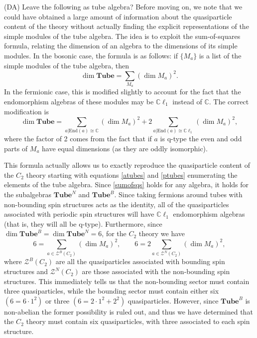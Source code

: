 \documentclass[12pt,a4paper]{article}
\newcommand{\cc}{\mathbb{C}}
\newcommand{\mcz}{\mathcal{Z}}
\newcommand\be            {\begin{equation}}
\newcommand\ee            {\end{equation}}
\newcommand{\End}{\text{End}}
\newcommand{\cl}{\mathbb{C}\ell}
\newcommand{\tube}{\textbf{Tube}}
\newcommand{\dave}[1]{{\color{ao(english)}\footnotesize{(DA) #1}}}
\begin{document}
\dave{Leave the following as tube algebra?}
Before moving on, we note that we could have obtained a large amount of information about the quasiparticle content of the theory without actually finding the explicit representations of the simple modules of the tube algebra. 
The idea is to exploit the sum-of-squares formula, relating the dimension of an algebra to the dimensions of its simple modules. 
In the bosonic case, the formula is as follows: if $\{M_a\}$ is a list of the simple modules of the tube algebra, then 
\be \dim \tube = \sum_{M_a} (\dim M_a)^2.\ee
In the fermionic case, this is modified slightly to account for the fact that the endomorphism algebras of these modules may be $\cl_1$ instead of $\cc$. The correct modification is
\be \label{sumofsqs} \dim \tube = \sum_{a | \End(a) \cong \cc} (\dim M_a)^2 + 2\sum_{a|\End(a) \cong \cl_1} (\dim M_a)^2,\ee
where the factor of 2 comes from the fact that if $a$ is q-type the even and odd parts of $M_a$ have equal dimensions (as they are oddly isomorphic). 

This formula actually allows us to exactly reproduce the quasiparticle content of the $C_2$ theory starting with equations \eqref{atubes} and \eqref{ptubes} enumerating the elements of the tube algebra. 
Since \eqref{sumofsqs} holds for any algebra, it holds for the subalgebras $\tube^N$ and $\tube^B$. 
Since taking fermions around tubes with non-bounding spin structures acts as the identity,
all of the quasiparticles associated with periodic spin structures will have $\cl_1$ endomorphism algebras (that is, they will all be q-type). Furthermore, since $\dim \tube^B = \dim \tube^N = 6$, for the $C_2$ theory we have 
\be 6 = \sum_{a \in \mcz^B(C_2)} (\dim M_a)^2,\qquad 6 = 2 \sum_{a\in \mcz^N(C_2)} (\dim M_a)^2,\ee
where $\mcz^B(C_2)$ are all the quasiparticles associated with bounding spin structures and $\mcz^N(C_2)$ are those associated with the non-bounding spin structures. 
This immediately tells us that the non-bounding sector must contain three quasiparticles, while the bounding sector must contain either six $(6 = 6\cdot 1^2)$ or three $(6=2\cdot 1^2 + 2^2)$ quasiparticles. 
However, since $\tube^B$ is non-abelian the former possibility is ruled out, and thus we have determined that the $C_2$ theory must contain six quasiparticles, with three associated to each spin structure. 

 
 
\end{document}
